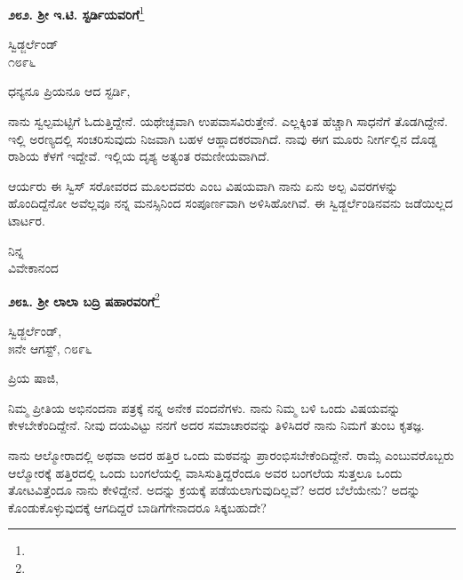 \begin{center}
\textbf{೨೮೨. ಶ‍್ರೀ ಇ.ಟಿ. ಸ್ಟರ್ಡಿಯವರಿಗೆ}\footnote{}
\end{center}

\vspace{-0.5cm}

\begin{flushright}
ಸ್ವಿಡ್ಜರ್ಲೆಂಡ್\\೧೮೯೬
\end{flushright}

\vspace{-0.3cm}

\noindent
ಧನ್ಯನೂ ಪ್ರಿಯನೂ ಆದ ಸ್ಟರ್ಡಿ,

ನಾನು ಸ್ವಲ್ಪಮಟ್ಟಿಗೆ ಓದುತ್ತಿದ್ದೇನೆ. ಯಥೇಚ್ಛವಾಗಿ ಉಪವಾಸವಿರುತ್ತೇನೆ. ಎಲ್ಲಕ್ಕಿಂತ ಹೆಚ್ಚಾಗಿ ಸಾಧನೆಗೆ ತೊಡಗಿದ್ದೇನೆ. ಇಲ್ಲಿ ಅರಣ್ಯದಲ್ಲಿ ಸಂಚರಿಸುವುದು ನಿಜವಾಗಿ ಬಹಳ ಆಹ್ಲಾದಕರವಾಗಿದೆ. ನಾವು ಈಗ ಮೂರು ನೀರ್ಗಲ್ಲಿನ ದೊಡ್ಡ ರಾಶಿಯ ಕೆಳಗೆ ಇದ್ದೇವೆ. ಇಲ್ಲಿಯ ದೃಶ್ಯ ಅತ್ಯಂತ ರಮಣೀಯವಾಗಿದೆ.

ಆರ್ಯರು ಈ ಸ್ವಿಸ್ ಸರೋವರದ ಮೂಲದವರು ಎಂಬ ವಿಷಯವಾಗಿ ನಾನು ಏನು ಅಲ್ಪ ವಿವರಗಳನ್ನು ಹೊಂದಿದ್ದೆನೋ ಅವೆಲ್ಲವೂ ನನ್ನ ಮನಸ್ಸಿನಿಂದ ಸಂಪೂರ್ಣವಾಗಿ ಅಳಿಸಿಹೋಗಿವೆ. ಈ ಸ್ವಿಡ್ಜರ್ಲೆಂಡಿನವನು ಜಡೆಯಿಲ್ಲದ ಟಾರ್ಟರ.

\vspace{-0.5cm}

{\flushright
ನಿನ್ನ\\ವಿವೇಕಾನಂದ\par}

\begin{center}
\textbf{೨೮೩. ಶ‍್ರೀ ಲಾಲಾ ಬದ್ರಿ ಷಹಾರವರಿಗೆ}\footnote{}
\end{center}

\vspace{-0.5cm}

\begin{flushright}
ಸ್ವಿಡ್ಜರ್ಲೆಂಡ್,\\೫ನೇ ಆಗಸ್ಟ್, ೧೮೯೬
\end{flushright}

\vspace{-0.3cm}

\noindent
ಪ್ರಿಯ ಷಾಜಿ,

ನಿಮ್ಮ ಪ್ರೀತಿಯ ಅಭಿನಂದನಾ ಪತ್ರಕ್ಕೆ ನನ್ನ ಅನೇಕ ವಂದನೆಗಳು. ನಾನು ನಿಮ್ಮ ಬಳಿ ಒಂದು ವಿಷಯವನ್ನು ಕೇಳಬೇಕೆಂದಿದ್ದೇನೆ. ನೀವು ದಯವಿಟ್ಟು ನನಗೆ ಅದರ ಸಮಾಚಾರವನ್ನು ತಿಳಿಸಿದರೆ ನಾನು ನಿಮಗೆ ತುಂಬ ಕೃತಜ್ಞ.

ನಾನು ಆಲ್ಮೋರಾದಲ್ಲಿ ಅಥವಾ ಅದರ ಹತ್ತಿರ ಒಂದು ಮಠವನ್ನು ಪ್ರಾರಂಭಿಸಬೇಕೆಂದಿದ್ದೇನೆ. ರಾಮ್ಸೆ ಎಂಬುವರೊಬ್ಬರು ಆಲ್ಮೋರಕ್ಕೆ ಹತ್ತಿರದಲ್ಲಿ ಒಂದು ಬಂಗಲೆಯಲ್ಲಿ ವಾಸಿಸುತ್ತಿದ್ದರೆಂದೂ ಅವರ ಬಂಗಲೆಯ ಸುತ್ತಲೂ ಒಂದು ತೋಟವಿತ್ತೆಂದೂ ನಾನು ಕೇಳಿದ್ದೇನೆ. ಅದನ್ನು ಕ್ರಯಕ್ಕೆ ಪಡೆಯಲಾಗುವುದಿಲ್ಲವೆ? ಅದರ ಬೆಲೆಯೇನು? ಅದನ್ನು ಕೊಂಡುಕೊಳ್ಳುವುದಕ್ಕೆ ಆಗದಿದ್ದರೆ ಬಾಡಿಗೆಗೇನಾದರೂ ಸಿಕ್ಕಬಹುದೇ?

